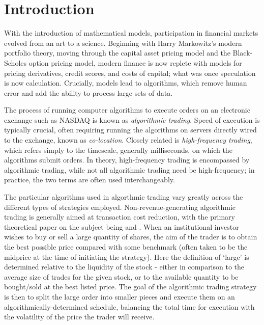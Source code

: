 \chapter{Introduction}

With the introduction of mathematical models, participation in financial markets evolved from an art to a science. Beginning with Harry Markowitz's modern portfolio theory, moving through the capital asset pricing model and the Black-Scholes option pricing model, modern finance is now replete with models for pricing derivatives, credit scores, and costs of capital; what was once speculation is now calculation. Crucially, models lead to algorithms, which remove human error and add the ability to process large sets of data. 

The process of running computer algorithms to execute orders on an electronic exchange such as NASDAQ is known as \emph{algorithmic trading}. Speed of execution is typically crucial, often requiring running the algorithms on servers directly wired to the exchange, known as \emph{co-location}. Closely related is \emph{high-frequency trading}, which refers simply to the timescale, generally milliseconds, on which the algorithms submit orders. In theory, high-frequency trading is encompassed by algorithmic trading, while not all algorithmic trading need be high-frequency; in practice, the two terms are often used interchangeably. 

The particular algorithms used in algorthmic trading vary greatly across the different types of strategies employed. Non-revenue-generating algorithmic trading is generally aimed at transaction cost reduction, with the primary theoretical paper on the subject being \citet{Bertsimas98} and \citet{Almgren01}. When an institutional investor wishes to buy or sell a large quantity of shares, the aim of the trader is to obtain the best possible price compared with some benchmark (often taken to be the midprice at the time of initiating the strategy). Here the definition of `large' is determined relative to the liquidity of the stock - either in comparison to the average size of trades for the given stock, or to the available quantity to be bought/sold at the best listed price. The goal of the algorithmic trading strategy is then to split the large order into smaller pieces and execute them on an algorithmically-determined schedule, balancing the total time for execution with the volatility of the price the trader will receive. 

